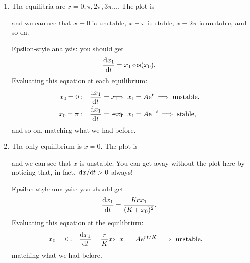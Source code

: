 \documentclass[a4paper, 12pt]{article}
\begin{document}
\begin{enumerate}[label={\bf \arabic{*}.\;}, ref={\arabic{*}},itemsep=3ex, left=0ex]
{\begin{enumerate}[label=(\alph*)]
        \item The equilibria are $x=0,\pi,2\pi,3\pi\dots$. The plot is

          \begin{center}
            
          \end{center}

          and we can see that $x=0$ is unstable, $x=\pi$ is stable, $x=2\pi$ is unstable, and so on.

          Epsilon-style analysis: you should get
          \begin{equation}
            \fd{x_1}{t} = x_1\cos(x_0).
          \end{equation}
          Evaluating this equation at each equilibrium:
          \begin{align}
            x_0 = 0: && \fd{x_1}{t} & = x_1 \hspace{-1cm} & \implies x_1 &=A\e^{t} \implies \text{unstable},\\
            x_0 = \pi: && \fd{x_1}{t} & = -x_1 \hspace{-1cm} & \implies x_1 &=A\e^{-t} \implies \text{stable},
          \end{align}
          and so on, matching what we had before.

        \item The only equilibrium is $x=0$. The plot is

          \begin{center}
            
          \end{center}

          and we can see that $x$ is unstable. You can get away without the plot here by noticing that, in fact, $\fd{x}{t}>0$ always!

          Epsilon-style analysis: you should get
          \begin{equation}
            \fd{x_1}{t} = \frac{K r x_1}{(K+x_0)^2}.
          \end{equation}
          Evaluating this equation at the equilibrium:
          \begin{align}
            x_0 = 0: && \fd{x_1}{t} & = \frac{r}{K} x_1 \hspace{-1cm} & \implies x_1 &=A\e^{rt/K} \implies \text{unstable},
          \end{align}
          matching what we had before.

      \end{enumerate}

}
\end{enumerate}
\end{document}
